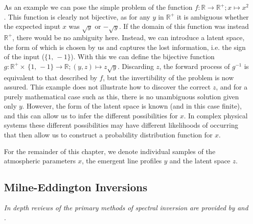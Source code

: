 As an example we can pose the simple problem of the function $f : \mathbb{R} \rightarrow \mathbb{R}^+; x \mapsto x^2$. This function is clearly not bijective, as for any $y$ in $\mathbb{R}^+$ it is ambiguous whether the expected input $x$ was $\sqrt{y}$ or $-\sqrt{y}$.
If the domain of this function was instead $\mathbb{R}^+$, there would be no ambiguity here.
Instead, we can introduce a latent space, the form of which is chosen by us and captures the lost information, i.e. the sign of the input ($\{1,\,-1\}$).
With this we can define the bijective function $g : \mathbb{R}^+\times\,\{1,\,-1\} \rightarrow \mathbb{R}; (y, z) \mapsto z \sqrt{y}$.
Discarding $z$, the forward process of $g^{-1}$ is equivalent to that described by $f$, but the invertibility of the problem is now assured.
This example does not illustrate how to discover the correct $z$, and for a purely mathematical case such as this, there is no unambiguous solution given only $y$.
However, the form of the latent space is known (and in this case finite), and this can allow us to infer the different possibilities for $x$.
In complex physical systems these different possibilities may have different likelihoods of occurring that then allow us to construct a probability distribution function for $x$.

For the remainder of this chapter, we denote individual samples of the atmospheric parameters $x$, the emergent line profiles $y$ and the latent space $z$.

\subsection{Milne-Eddington Inversions}

\emph{In depth reviews of the primary methods of spectral inversion are provided by \citet{DelToroIniesta2016} and \citet{DelaCruzRodriguez2017}.}

